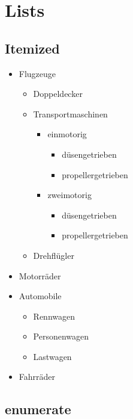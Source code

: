 \chapter{Lists}
\section{Itemized}

\begin{itemize}
	\item Flugzeuge
	\begin{itemize}
		\item Doppeldecker
		\item Transportmaschinen
		\begin{itemize}
			\item einmotorig
			\begin{itemize}
				\item{düsengetrieben}
				\item{propellergetrieben}
			\end{itemize}
			\item zweimotorig
			\begin{itemize}
				\item{düsengetrieben}
				\item{propellergetrieben}
			\end{itemize}
		\end{itemize}
		\item Drehflügler
	\end{itemize}
	\item Motorräder
	\item Automobile
	\begin{itemize}
		\item Rennwagen
		\item Personenwagen
		\item Lastwagen
	\end{itemize}
	\item Fahrräder
\end{itemize}

\section{enumerate}

